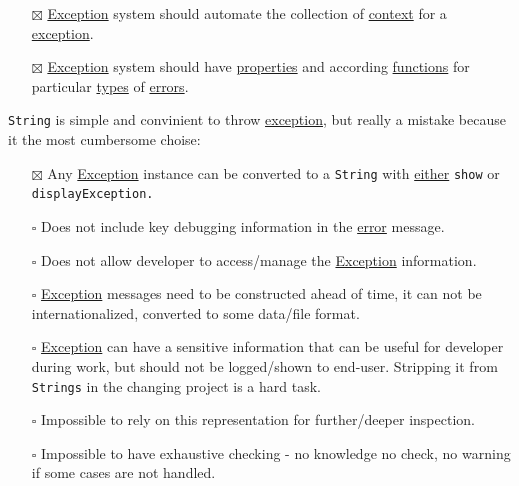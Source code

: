 \documentclass[a4paper,14pt,oneside]{book}
\begin{document}
\begin{itemize}
\item[{$\boxtimes$}] \hyperref[org3882403]{Exception} system should automate the collection of \hyperref[orgbaab0e5]{context} for a \hyperref[org3882403]{exception}.\\
\item[{$\boxtimes$}] \hyperref[org3882403]{Exception} system should have \hyperref[org533778b]{properties} and according \hyperref[org69a4fa1]{functions} for particular \hyperref[orgb6d8f90]{types} of \hyperref[org13e4be2]{errors}.\\
\end{itemize}

\texttt{String} is simple and convinient to throw \hyperref[org3882403]{exception}, but really a mistake because it the most cumbersome choise:\\
\begin{itemize}
\item[{$\boxtimes$}] Any \hyperref[org3882403]{Exception} instance can be converted to a \texttt{String} with \hyperref[org7c5db10]{either} \texttt{show} or \texttt{displayException.}\\
\item[{$\square$}] Does not include key debugging information in the \hyperref[orgdbf9386]{error} message.\\
\item[{$\square$}] Does not allow developer to access/manage the \hyperref[org3882403]{Exception} information.\\
\item[{$\square$}] \hyperref[org3882403]{Exception} messages need to be constructed ahead of time, it can not be internationalized, converted to some data/file format.\\
\item[{$\square$}] \hyperref[org3882403]{Exception} can have a sensitive information that can be useful for developer during work, but should not be logged/shown to end-user. Stripping it from \texttt{Strings} in the changing project is a hard task.\\
\item[{$\square$}] Impossible to rely on this representation for further/deeper inspection.\\
\item[{$\square$}] Impossible to have exhaustive checking - no knowledge no check, no warning if some cases are not handled.\\
\end{itemize}
\end{document}
